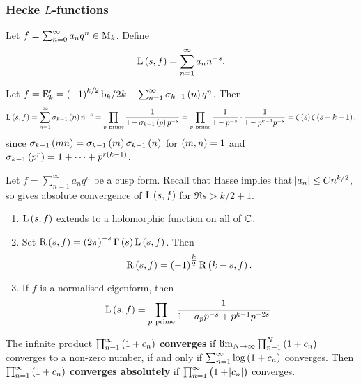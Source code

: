 \subsubsection{Hecke \texorpdfstring{$ L $}{L}-functions}

Let $ f = \sum_{n = 0}^\infty a_nq^n \in \mathrm{M}_k $. Define
$$ \L\br{s, f} = \sum_{n = 1}^\infty a_nn^{-s}. $$

\begin{example*}
Let $ f = \E_k' = \br{-1}^{k / 2}\b_k / 2k + \sum_{n = 1}^\infty \sigma_{k - 1}\br{n}q^n $. Then
$$ \L\br{s, f} = \sum_{n = 1}^\infty \sigma_{k - 1}\br{n}n^{-s} = \prod_{p \ \text{prime}} \dfrac{1}{1 - \sigma_{k - 1}\br{p}p^{-s}} = \prod_{p \ \text{prime}} \dfrac{1}{1 - p^{-s}} \cdot \dfrac{1}{1 - p^{k - 1}p^{-s}} = \zeta\br{s}\zeta\br{s - k + 1}, $$
since $ \sigma_{k - 1}\br{mn} = \sigma_{k - 1}\br{m}\sigma_{k - 1}\br{n} $ for $ \br{m, n} = 1 $ and $ \sigma_{k - 1}\br{p^r} = 1 + \dots + p^{r\br{k - 1}} $.
\end{example*}


Let $ f = \sum_{n = 1}^\infty a_nq^n $ be a cusp form. Recall that Hasse implies that $ \abs{a_n} \le Cn^{k / 2} $, so gives absolute convergence of $ \L\br{s, f} $ for $ \Re s > k / 2 + 1 $.

\begin{theorem}
\label{thm:lfunction}
\hfill
\begin{enumerate}
\item $ \L\br{s, f} $ extends to a holomorphic function on all of $ \mathbb{C} $.
\item Set $ \R\br{s, f} = \br{2\pi}^{-s}\Gamma\br{s}\L\br{s, f} $. Then
$$ \R\br{s, f} = \br{-1}^{\tfrac{k}{2}}\R\br{k - s, f}. $$
\item If $ f $ is a normalised eigenform, then
$$ \L\br{s, f} = \prod_{p \ \text{prime}} \dfrac{1}{1 - a_pp^{-s} + p^{k - 1}p^{-2s}}. $$
\end{enumerate}
\end{theorem}

\pagebreak

\begin{definition}
The infinite product $ \prod_{n = 1}^\infty \br{1 + c_n} $ \textbf{converges} if $ \lim_{N \to \infty} \prod_{n = 1}^N \br{1 + c_n} $ converges to a non-zero number, if and only if $ \sum_{n = 1}^\infty \log \br{1 + c_n} $ converges. Then $ \prod_{n = 1}^\infty \br{1 + c_n} $ \textbf{converges absolutely} if $ \prod_{n = 1}^\infty \br{1 + \abs{c_n}} $ converges.
\end{definition}

